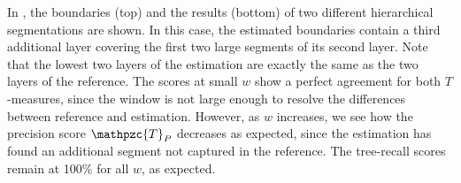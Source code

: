 \documentclass{article}
\def\shag{\ensuremath{\mathpzc{T}}}
\begin{document}

In , the boundaries (top) and the results (bottom) of two different hierarchical segmentations are shown.
In this case, the estimated boundaries contain a third additional layer covering the first two large segments of its second layer.
Note that the lowest two layers of the estimation are exactly the same as the two layers of the reference.
The scores at small $w$ show a perfect agreement for both $T$-measures, since the window
is not large enough to resolve the differences between reference and estimation.
However, as $w$ increases, we see how the precision score $\shag_P$ decreases as expected, since the
estimation has found an additional segment not captured in the reference.
The tree-recall scores remain at 100\% for all $w$, as expected.
\end{document}
